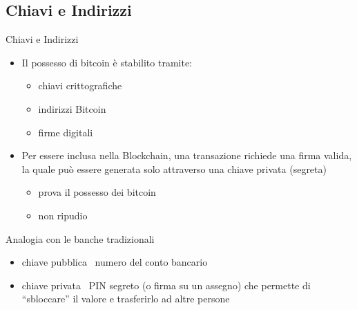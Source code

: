 \documentclass{beamer}
\begin{document}
  \subsection{Chiavi e Indirizzi}
  \begin{frame}{Chiavi e Indirizzi}
    \begin{itemize}
      \item Il possesso di bitcoin è stabilito tramite:
      \begin{itemize}
          \item chiavi crittografiche 
          \item indirizzi Bitcoin 
          \item firme digitali
      \end{itemize} 
      \item Per essere inclusa nella Blockchain, una transazione richiede una firma valida, la quale può essere generata solo attraverso una chiave privata (segreta)  
      \begin{itemize}
          \item prova il possesso dei bitcoin
          \item non ripudio
      \end{itemize}
    \pause
    \end{itemize}
    \begin{block}{Analogia con le banche tradizionali}
      \begin{itemize}
        \item chiave pubblica \MVRightarrow\, numero del conto bancario
        \item chiave privata \MVRightarrow\, PIN segreto (o firma su un assegno) che permette di ``sbloccare'' il valore e trasferirlo ad altre persone 
      \end{itemize}
    \end{block}
  \end{frame}
\end{document}
